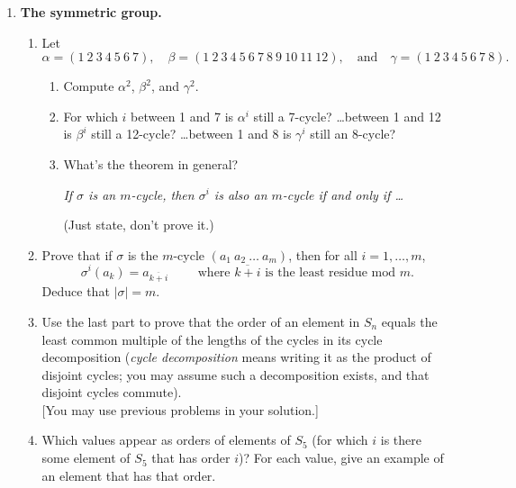 \documentclass[11pt, reqno]{amsart}
\theoremstyle{plain}
\theoremstyle{definition}
\theoremstyle{example}
\begin{document}
\begin{enumerate}[1.]
\begin{enumerate}
\begin{proof}
Hence, the elements $s_1$ and $s_2$ together with the relations shown above fully describe the initial presentation of $D_{2n}$.
\end{proof}	
\end{enumerate}

\item {\bf The symmetric group. }
\begin{enumerate}
\item Let $$\alpha = (1~2~3~4~5~6~7), \quad \beta =(1~2~3~4~5~6~7~8~9~10~11~12), \quad \text{and}\quad \gamma = (1~2~3~4~5~6~7~8).$$
	\begin{enumerate}
	\item Compute $\alpha^2$, $\beta^2$, and $\gamma^2$.
	\item For which $i$ between 1 and 7 is $\alpha^i$ still a 7-cycle? \dots between 1 and 12 is $\beta^i$ still a 12-cycle? \dots between 1 and 8 is $\gamma^i$ still an 8-cycle?
	\item What's the theorem in general? \\
	\centerline{\emph{If $\sigma$ is an $m$-cycle, then $\sigma^i$ is also an $m$-cycle if and only if \dots}}
	(Just state, don't prove it.)
	\end{enumerate}

	\item Prove that if $\sigma$ is the $m$-cycle $(a_1~a_2~\dots~a_m)$, then for all $i =1, \dots, m$, 
$$\sigma^i(a_k) = a_{\overline{k+{i}}} \qquad \text{ where $\overline{k+{i}}$ is the least residue mod $m$.}$$
Deduce that $|\sigma|=m$. 


	\item Use the last part to prove that the order of an element in $S_n$ equals the least common multiple of the lengths of the cycles in its cycle decomposition (\emph{cycle decomposition} means writing it as the product of disjoint cycles; you may assume such a decomposition exists, and that disjoint cycles commute).\\
	 {[You may use previous problems in your solution.]}

	\item Which values appear as orders of elements of $S_5$ (for which $i$ is there some element of $S_5$ that has order $i$)? For each value, give an example of an element that has that order. 
\end{enumerate}



\end{enumerate}
\end{document}

